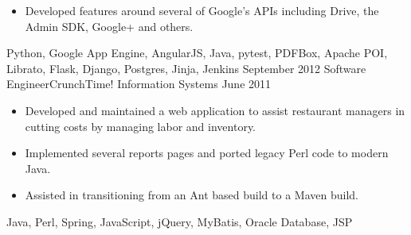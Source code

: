\begin{experiences}
{\begin{itemize}
                        \item Developed features around several of Google's APIs including Drive, the Admin SDK, Google+ and others.
                      \end{itemize}
                  }
                  {Python, Google App Engine, AngularJS, Java, pytest, PDFBox, Apache POI, Librato, Flask, Django, Postgres, Jinja, Jenkins}
\emptySeparator
  \experience
  {September 2012}  {Software Engineer}{CrunchTime! Information Systems}
  {June 2011}   {
                      \begin{itemize}
                        \item Developed and maintained a web application to assist restaurant managers in cutting costs by managing labor and inventory.
                        \item Implemented several reports pages and ported legacy Perl code to modern Java.   
                        \item Assisted in transitioning from an Ant based build to a Maven build.
                      \end{itemize}
                  }
                  {Java, Perl, Spring, JavaScript, jQuery, MyBatis, Oracle Database, JSP}
\end{experiences}
